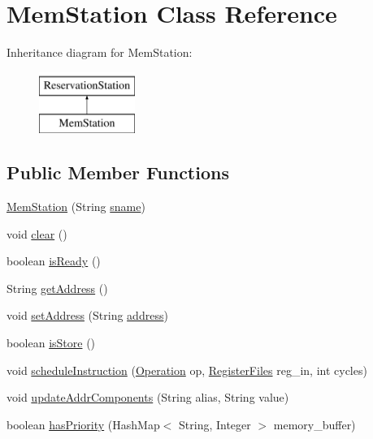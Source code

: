 \hypertarget{classMemStation}{\section{\-Mem\-Station \-Class \-Reference}
\label{classMemStation}
}
\-Inheritance diagram for \-Mem\-Station\-:\begin{figure}[H]
\begin{center}
\leavevmode
\includegraphics[height=2.000000cm]{classMemStation}
\end{center}
\end{figure}
\subsection*{\-Public \-Member \-Functions}
\begin{DoxyCompactItemize}
\item 
\hyperlink{classMemStation_a94ab3bf32e281cd07628b931b0a962f2}{\-Mem\-Station} (\-String \hyperlink{classReservationStation_a2c0bd5b95f126395b0ab081394f090f6}{sname})
\item 
void \hyperlink{classMemStation_ab02b57a1bea7277dab474c8ffd7ac5ac}{clear} ()
\item 
boolean \hyperlink{classMemStation_ac118dad2969d9bab0c2813b0e8681aa7}{is\-Ready} ()
\item 
\-String \hyperlink{classMemStation_a7488a8869905139d9a9ac0e0b7789327}{get\-Address} ()
\item 
void \hyperlink{classMemStation_a020c83f5370751b713b77bc5f419c06f}{set\-Address} (\-String \hyperlink{classMemStation_aeed8a623b07e146133976083b88ae513}{address})
\item 
boolean \hyperlink{classMemStation_a210ea0822fa342eae23ae190e38a0f96}{is\-Store} ()
\item 
void \hyperlink{classMemStation_af5cbfa20af449839121307147b3af436}{schedule\-Instruction} (\hyperlink{classOperation}{\-Operation} op, \hyperlink{classRegisterFiles}{\-Register\-Files} reg\-\_\-in, int cycles)
\item 
void \hyperlink{classMemStation_a4b9152fcfe59b601e7cf80e0a6ccc105}{update\-Addr\-Components} (\-String alias, \-String value)
\item 
boolean \hyperlink{classMemStation_afa9b7145ca1157b98d1f7d226b384b1d}{has\-Priority} (\-Hash\-Map$<$ \-String, \-Integer $>$ memory\-\_\-buffer)
\end{DoxyCompactItemize}
